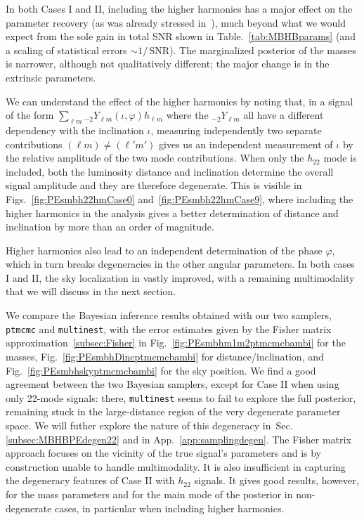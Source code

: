 \documentclass[aps,showpacs,twocolumn,prd,superscriptaddress,nofootinbib]{revtex4-1}
\newcommand{\SNR}{\,\mathrm{SNR}}
\newcommand{\sYlm}{{}_{-2}Y_{\ell m}}
\begin{document}
In both Cases I and II, including the higher harmonics has a major effect on the parameter recovery (as was already stressed in~\cite{Arun+07a, TriasSintes07, PorterCornish08, McWilliams+09}), much beyond what we would expect from the sole gain in total SNR shown in Table.~\ref{tab:MBHBparams} (and a scaling of statistical errors $\sim 1/\SNR$). The marginalized posterior of the masses is narrower, although not qualitatively different; the major change is in the extrinsic parameters.

We can understand the effect of the higher harmonics by noting that, in a signal of the form $\sum_{\ell m} \sYlm(\iota, \varphi)h_{\ell m}$ where the $\sYlm$ all have a different dependency with the inclination $\iota$, measuring independently two separate contributions $(\ell m) \neq (\ell' m')$ gives us an independent measurement of $\iota$ by the relative amplitude of the two mode contributions. When only the $h_{22}$ mode is included, both the luminosity distance and inclination determine the overall signal amplitude and they are therefore degenerate. This is visible in Figs.~\ref{fig:PEsmbh22hmCase0} and~\ref{fig:PEsmbh22hmCase9}, where including the higher harmonics in the analysis gives a better determination of distance and inclination by more than an order of magnitude.

Higher harmonics also lead to an independent determination of the phase $\varphi$, which in turn breaks degeneracies in the other angular parameters. In both cases I and II, the sky localization in vastly improved, with a remaining multimodality that we will discuss in the next section.

We compare the Bayesian inference results obtained with our two samplers, \texttt{ptmcmc} and \texttt{multinest}, with the error estimates given by the Fisher matrix approximation~\ref{subsec:Fisher} in Fig.~\ref{fig:PEsmbhm1m2ptmcmcbambi} for the masses, Fig.~\ref{fig:PEsmbhDincptmcmcbambi} for distance/inclination, and Fig.~\ref{fig:PEsmbhskyptmcmcbambi} for the sky position. We find a good agreement between the two Bayesian samplers, except for Case II when using only 22-mode signals: there, \texttt{multinest} seems to fail to explore the full posterior, remaining stuck in the large-distance region of the very degenerate parameter space. We will futher explore the nature of this degeneracy in~Sec.\ref{subsec:MBHBPEdegen22} and in App.~\ref{app:samplingdegen}. The Fisher matrix approach focuses on the vicinity of the true signal's parameters and is by construction unable to handle multimodality. It is also insufficient in capturing the degeneracy features of Case II with $h_{22}$ signals. It gives good results, however, for the mass parameters and for the main mode of the posterior in non-degenerate cases, in particular when including higher harmonics.
\end{document}
